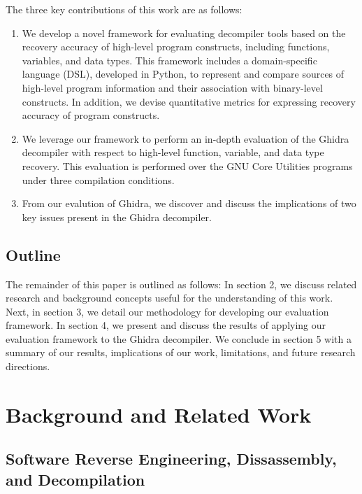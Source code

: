 \documentclass[conference]{IEEEtran}
\begin{document}
The three key contributions of this work are as follows:
\begin{enumerate}
    \item We develop a novel framework for evaluating decompiler tools based on the recovery accuracy of high-level program constructs, including functions, variables, and data types. This framework includes a domain-specific language (DSL), developed in Python, to represent and compare sources of high-level program information and their association with binary-level constructs. In addition, we devise quantitative metrics for expressing recovery accuracy of program constructs.
    \item We leverage our framework to perform an in-depth evaluation of the Ghidra decompiler with respect to high-level function, variable, and data type recovery. This evaluation is performed over the GNU Core Utilities programs under three compilation conditions.
    \item From our evalution of Ghidra, we discover and discuss the implications of two key issues present in the Ghidra decompiler.
\end{enumerate}

\subsection{Outline}

The remainder of this paper is outlined as follows: In section 2, we discuss related research and background concepts useful for the understanding of this work. Next, in section 3, we detail our methodology for developing our evaluation framework. In section 4, we present and discuss the results of applying our evaluation framework to the Ghidra decompiler. We conclude in section 5 with a summary of our results, implications of our work, limitations, and future research directions.

\section{Background and Related Work}

\subsection{Software Reverse Engineering, Dissassembly, and Decompilation}
\end{document}
